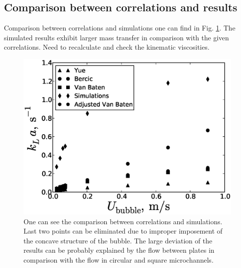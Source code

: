 \documentclass{article}
\begin{document}
\subsection{Comparison between correlations and results}
Comparison between correlations and simulations one can find in Fig.
\ref{fig:comparison:correlations}. The simulated results exhibit larger mass transfer in comparison
with the given correlations. {\color{red} Need to recalculate and check the kinematic viscosities.}
\begin{figure}[htb!]
\includegraphics[width=\textwidth]{Figures/comparison_correlations.eps}
\caption{One can see the comparison between correlations and simulations. {\color{red} Last two
points can be eliminated due to improper imposement of the concave structure of the bubble. The
large deviation of the results can be probably explained by the flow between plates in comparison
with the flow in circular and square microchannels.} \label{fig:comparison:correlations}}
\end{figure}
\end{document}
